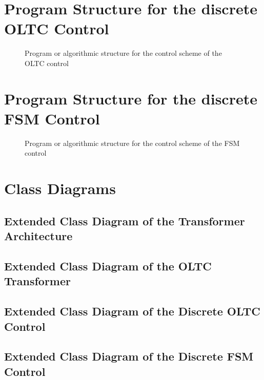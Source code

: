 \section{Program Structure for the discrete OLTC Control}

\begin{figure}[H]
    \centering
    \caption[Program or algorithmic structure for the control scheme of the OLTC control]{Program or algorithmic structure for the control scheme of the OLTC control}
    \label{fig:oltc-program-plan}
\end{figure}

\section{Program Structure for the discrete FSM Control}

\begin{figure}[H]
    \centering
    \caption[Program or algorithmic structure for the control scheme of the FSM control]{Program or algorithmic structure for the control scheme of the FSM control}
    \label{fig:fsm-program-plan}
\end{figure}

\section{Class Diagrams}

\subsection{Extended Class Diagram of the Transformer Architecture}

\subsection{Extended Class Diagram of the OLTC Transformer}

\subsection{Extended Class Diagram of the Discrete OLTC Control}
\subsection{Extended Class Diagram of the Discrete FSM Control}

